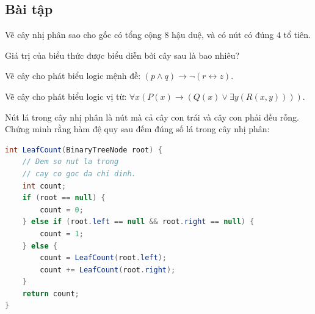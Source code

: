 \subsection*{Bài tập}
\begin{exercise}
Vẽ cây nhị phân sao cho gốc có tổng cộng $8$ hậu duệ, và có nút có đúng $4$ tổ tiên.
\end{exercise}

\begin{exercise}
Giá trị của biểu thức được biểu diễn bởi cây sau là bao nhiêu?

\begin{center}
\end{center}
\end{exercise}

\begin{exercise}
Vẽ cây cho phát biểu logic mệnh đề: $(p \wedge q) \to \neg(r \leftrightarrow z)$.
\end{exercise}

\begin{exercise}
Vẽ cây cho phát biểu logic vị từ: $\forall x(P(x) \to (Q(x) \vee \exists y(R(x, y))))$.
\end{exercise}

\begin{exercise}
Nút lá trong cây nhị phân là nút mà cả cây con trái và cây con phải đều rỗng. Chứng minh rằng hàm đệ quy sau đếm đúng số lá trong cây nhị phân:
\begin{lstlisting}[language=Java]
int LeafCount(BinaryTreeNode root) {
    // Dem so nut la trong
    // cay co goc da chi dinh.
    int count;
    if (root == null) {
        count = 0;
    } else if (root.left == null && root.right == null) {
        count = 1;
    } else {
        count = LeafCount(root.left);
        count += LeafCount(root.right);
    }
    return count;
}
\end{lstlisting}
\end{exercise}

